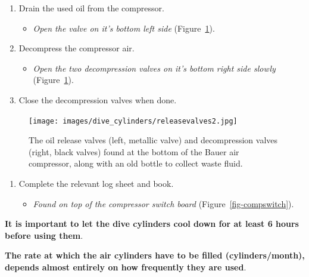 \documentclass[
  12pt,
]{report}
\providecommand{\tightlist}{%
  \setlength{\itemsep}{0pt}\setlength{\parskip}{0pt}}\usepackage{longtable,booktabs,array}
\begin{document}
\begin{enumerate}
\def\labelenumi{\arabic{enumi}.}
\setcounter{enumi}{14}
\tightlist
\item
  Drain the used oil from the compressor.

  \begin{itemize}
  \tightlist
  \item
    \emph{Open the valve on it's bottom left side}
    (Figure~\ref{fig-releasevalves}).
  \end{itemize}
\item
  Decompress the compressor air.

  \begin{itemize}
  \tightlist
  \item
    \emph{Open the two decompression valves on it's bottom right side
    slowly} (Figure~\ref{fig-releasevalves}).
  \end{itemize}
\item
  Close the decompression valves when done.
\end{enumerate}

\begin{figure}[H]

{\centering \texttt{[image: images/dive\_cylinders/releasevalves2.jpg]}

}

\caption{\label{fig-releasevalves}The oil release valves (left, metallic
valve) and decompression valves (right, black valves) found at the
bottom of the Bauer air compressor, along with an old bottle to collect
waste fluid.}

\end{figure}

\begin{enumerate}
\def\labelenumi{\arabic{enumi}.}
\setcounter{enumi}{17}
\tightlist
\item
  Complete the relevant log sheet and book.

  \begin{itemize}
  \tightlist
  \item
    \emph{Found on top of the compressor switch board}
    (Figure~\ref{fig-compswitch}).
  \end{itemize}
\end{enumerate}

\textbf{It is important to let the dive cylinders cool down for at least
6 hours before using them}.

\textbf{The rate at which the air cylinders have to be filled
(cylinders/month), depends almost entirely on how frequently they are
used}.
\end{document}
